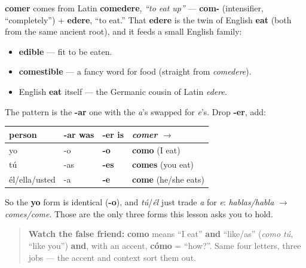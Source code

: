 \begin{cousinweb}
\textbf{comer} comes from Latin \textbf{comedere}, \emph{\textquotedblleft{}to eat up\textquotedblright{}} — \textbf{com-} (intensifier, \textquotedblleft{}completely\textquotedblright{}) + \textbf{edere}, \textquotedblleft{}to eat.\textquotedblright{} That \textbf{edere} is the twin of English \textbf{eat} (both from the same ancient root), and it feeds a small English family:

\begin{itemize}
\raggedright
  \item \textbf{edible} — fit to be eaten.
  \item \textbf{comestible} — a fancy word for food (straight from \emph{comedere}).
  \item English \textbf{eat} itself — the Germanic cousin of Latin \emph{edere}.
\end{itemize}
\end{cousinweb}

\begin{grammarlens}[title={Grammar Lens: the -er present tense}]
The pattern is the \textbf{-ar} one with the \emph{a}'s swapped for \emph{e}'s. Drop \textbf{-er}, add:

\noindent
\begin{tabularx}{\linewidth}{@{}>{\raggedright\arraybackslash}X>{\raggedright\arraybackslash}X>{\raggedright\arraybackslash}X>{\raggedright\arraybackslash}X@{}}
\toprule
\textbf{person} & \textbf{-ar was} & \textbf{\textbf{-er} is} & \textbf{\emph{comer} $\to$} \\
\midrule
yo & -o & \textbf{-o} & \textbf{como} (I eat) \\
tú & -as & \textbf{-es} & \textbf{comes} (you eat) \\
él/ella/usted & -a & \textbf{-e} & \textbf{come} (he/she eats) \\
\bottomrule
\end{tabularx}

So the \textbf{yo} form is identical (\textbf{-o}), and \emph{tú}/\emph{él} just trade \emph{a} for \emph{e}: \emph{hablas/habla} $\to$ \emph{comes/come}. Those are the only three forms this lesson asks you to hold.

\begin{quote}
\textbf{Watch the false friend:} \textbf{como} means \textquotedblleft{}I eat\textquotedblright{} \textbf{and} \textquotedblleft{}like/as\textquotedblright{} (\emph{como tú}, \textquotedblleft{}like you\textquotedblright{}) \textbf{and}, with an accent, \textbf{cómo} = \textquotedblleft{}how?\textquotedblright{}. Same four letters, three jobs — the accent and context sort them out.
\end{quote}
\end{grammarlens}

